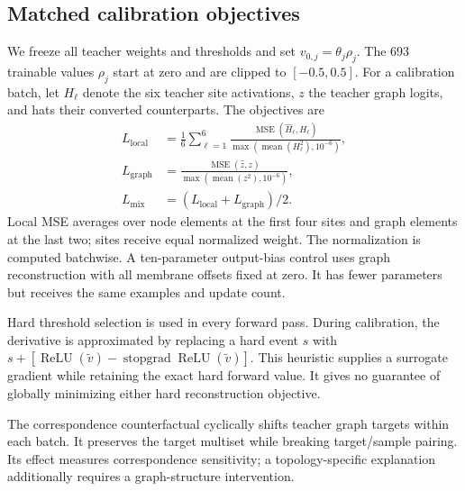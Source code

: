 \documentclass[10pt,twocolumn]{article}
\begin{document}
\subsection{Matched calibration objectives}
We freeze all teacher weights and thresholds and set $v_{0,j}=\theta_j\rho_j$. The 693 trainable values $\rho_j$ start at zero and are clipped to $[-0.5,0.5]$. For a calibration batch, let $H_\ell$ denote the six teacher site activations, $z$ the teacher graph logits, and hats their converted counterparts. The objectives are
\begin{align}
 L_{\mathrm{local}}&=\frac16\sum_{\ell=1}^{6}
 \frac{\operatorname{MSE}(\widehat H_\ell,H_\ell)}
 {\max(\operatorname{mean}(H_\ell^2),10^{-6})},\\
 L_{\mathrm{graph}}&=\frac{\operatorname{MSE}(\widehat z,z)}
 {\max(\operatorname{mean}(z^2),10^{-6})},\\
 L_{\mathrm{mix}}&=(L_{\mathrm{local}}+L_{\mathrm{graph}})/2.
\end{align}
Local MSE averages over node elements at the first four sites and graph elements at the last two; sites receive equal normalized weight. The normalization is computed batchwise. A ten-parameter output-bias control uses graph reconstruction with all membrane offsets fixed at zero. It has fewer parameters but receives the same examples and update count.

Hard threshold selection is used in every forward pass. During calibration, the derivative is approximated by replacing a hard event $s$ with $s+[\operatorname{ReLU}(\widetilde v)-\operatorname{stopgrad}\operatorname{ReLU}(\widetilde v)]$. This heuristic supplies a surrogate gradient while retaining the exact hard forward value. It gives no guarantee of globally minimizing either hard reconstruction objective.

The correspondence counterfactual cyclically shifts teacher graph targets within each batch. It preserves the target multiset while breaking target/sample pairing. Its effect measures correspondence sensitivity; a topology-specific explanation additionally requires a graph-structure intervention.
\end{document}
